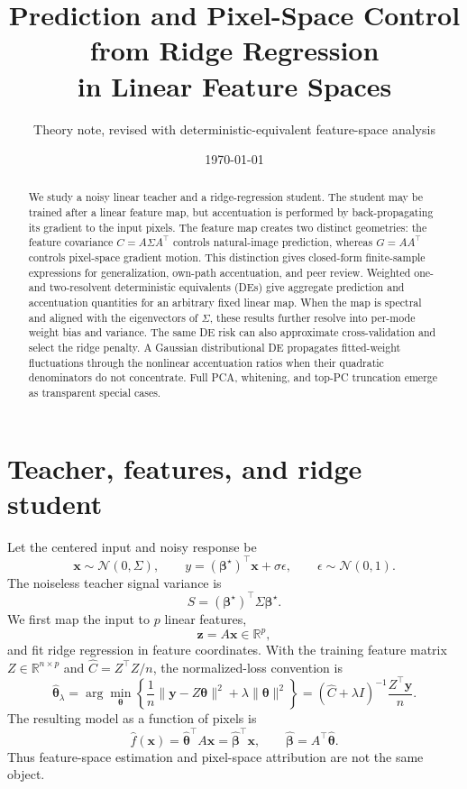 \documentclass[11pt]{article}
\title{Prediction and Pixel-Space Control from Ridge Regression\\
in Linear Feature Spaces}
\author{Theory note, revised with deterministic-equivalent feature-space analysis}
\date{\today}
\newcommand{\R}{\mathbb{R}}
\newcommand{\bhat}{\widehat{\bm\beta}}
\newcommand{\bstar}{\bm\beta^{\star}}
\newcommand{\that}{\widehat{\bm\theta}}
\begin{document}
\maketitle

\begin{abstract}
We study a noisy linear teacher and a ridge-regression student.  The student
may be trained after a linear feature map, but accentuation is performed by
back-propagating its gradient to the input pixels.  The feature map creates two
distinct geometries: the feature covariance
$C=A\Sigma A^{\top}$ controls natural-image prediction, whereas
$G=AA^{\top}$ controls pixel-space gradient motion.  This distinction gives
closed-form finite-sample expressions for generalization, own-path
accentuation, and peer review.  Weighted one- and two-resolvent deterministic
equivalents (DEs) give aggregate prediction and accentuation quantities for an
arbitrary fixed linear map.  When the map is spectral and aligned with the
eigenvectors of $\Sigma$, these results further resolve into per-mode weight
bias and variance.  The same DE risk can also approximate cross-validation and
select the ridge penalty.  A Gaussian distributional DE propagates fitted-weight
fluctuations through the nonlinear accentuation ratios when their quadratic
denominators do not concentrate.  Full PCA, whitening, and top-PC truncation
emerge as transparent special cases.
\end{abstract}

\section{Teacher, features, and ridge student}

Let the centered input and noisy response be
\begin{equation}
  \bm x\sim\mathcal N(0,\Sigma),\qquad
  y=(\bstar)^{\top}\bm x+\sigma\epsilon,
  \qquad \epsilon\sim\mathcal N(0,1).
\end{equation}
The noiseless teacher signal variance is
\begin{equation}
  S=(\bstar)^{\top}\Sigma\bstar.
\end{equation}
We first map the input to $p$ linear features,
\begin{equation}
  \bm z=A\bm x\in\R^p,
\end{equation}
and fit ridge regression in feature coordinates.  With the training feature
matrix $Z\in\R^{n\times p}$ and
$\widehat C=Z^{\top}Z/n$, the normalized-loss convention is
\begin{equation}
  \that_\lambda
  =\arg\min_{\bm\theta}
   \left\{\frac{1}{n}\lVert\bm y-Z\bm\theta\rVert^2
                 +\lambda\lVert\bm\theta\rVert^2\right\}
  =(\widehat C+\lambda I)^{-1}\frac{Z^{\top}\bm y}{n}.
  \label{eq:feature-ridge}
\end{equation}
The resulting model as a function of pixels is
\begin{equation}
  \widehat f(\bm x)=\that^{\top}A\bm x=\bhat^{\top}\bm x,
  \qquad \bhat=A^{\top}\that.
  \label{eq:pixel-weight}
\end{equation}
Thus feature-space estimation and pixel-space attribution are not the same
object.
\end{document}
